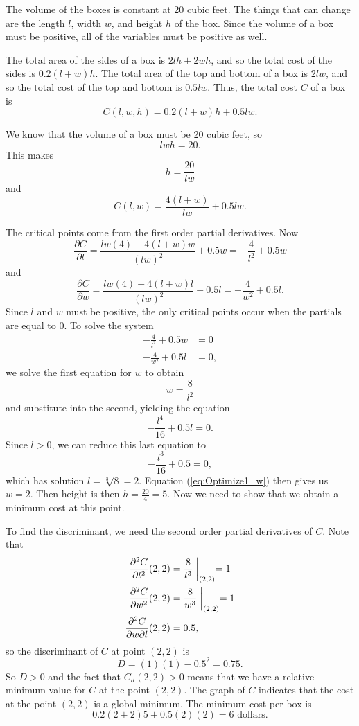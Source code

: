 \begin{activitySolution}
\ba
\item The volume of the boxes is constant at 20 cubic feet. The things that can change are the length $l$, width $w$, and height $h$ of the box. Since the volume of a box must be positive, all of the variables must be positive as well.

\item The total area of the sides of a box is $2lh + 2wh$, and so the total cost of the sides is $0.2(l+w)h$. The total area of the top and bottom of a box is $2lw$, and so the total cost of the top and bottom is $0.5lw$. Thus, the total cost $C$ of a box is
\[C(l,w,h) = 0.2(l+w)h + 0.5lw.\]

\item We know that the volume of a box must be 20 cubic feet, so
\[lwh = 20.\]
This makes
\[h = \frac{20}{lw}\]
and
\[C(l,w) = \frac{4(l+w)}{lw} + 0.5lw.\]

\item The critical points come from the first order partial derivatives. Now
\[\frac{\partial C}{\partial l} = \frac{lw(4)-4(l+w)w}{(lw)^2} + 0.5w = -\frac{4}{l^2} + 0.5w\]
and
\[\frac{\partial C}{\partial w} = \frac{lw(4)-4(l+w)l}{(lw)^2} + 0.5l = -\frac{4}{w^2} + 0.5l.\]
Since $l$ and $w$ must be positive, the only critical points occur when the partials are equal to 0. To solve the system
\begin{align*}
-\frac{4}{l^2} + 0.5w &= 0 \\
-\frac{4}{w^2} + 0.5l &= 0,
\end{align*}
we solve the first equation for $w$ to obtain
\begin{equation} \label{eq:Optimize1_w}
w = \frac{8}{l^2}
\end{equation}
and substitute into the second, yielding the equation
\[-\frac{l^4}{16} + 0.5l = 0.\]
Since $l > 0$, we can reduce this last equation to
\[-\frac{l^3}{16} + 0.5 = 0,\]
which has solution $l = \sqrt[3]{8} = 2$. Equation (\ref{eq:Optimize1_w}) then gives us $w = 2$. Then height is then ${h=\frac{20}{4} = 5}$.  Now we need to show that we obtain a minimum cost at this point.

To find the discriminant, we need the second order partial derivatives of $C$. Note that
\begin{align*}
\frac{\partial^2 C}{\partial l^2}(2,2) &= \frac{8}{l^3}\biggm|_{(2,2)} = 1 \\
\frac{\partial^2 C}{\partial w^2}(2,2) &= \frac{8}{w^3}\biggm|_{(2,2)} = 1 \\
\frac{\partial^2 C}{\partial w \partial l}(2,2) &= 0.5,
\end{align*}
so the discriminant of $C$ at point $(2,2)$ is
\[D=(1)(1) - 0.5^2 = 0.75.\]
So $D>0$ and the fact that $C_{ll}(2,2) > 0$ means that we have a relative minimum value for $C$ at the point $(2,2)$. The graph of $C$ indicates that the cost at the point $(2,2)$ is a global minimum. The minimum cost per box is
\[0.2(2+2)5 + 0.5(2)(2) = 6 \text{ dollars}.\]
\ea

\end{activitySolution}
\aftera

